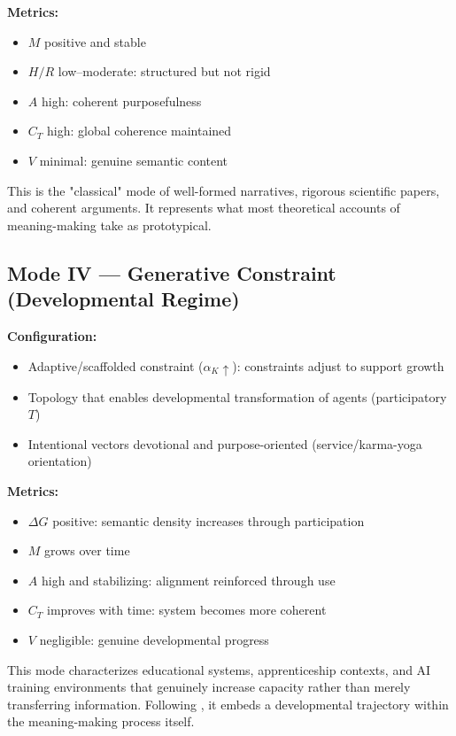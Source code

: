 \documentclass[12pt]{article}
\begin{document}
\textbf{Metrics:}
\begin{itemize}
\item $M$ positive and stable
\item $H/R$ low–moderate: structured but not rigid
\item $A$ high: coherent purposefulness
\item $C_T$ high: global coherence maintained
\item $V$ minimal: genuine semantic content
\end{itemize}

This is the "classical" mode of well-formed narratives, rigorous scientific papers, and coherent arguments. It represents what most theoretical accounts of meaning-making take as prototypical.

\subsection{Mode IV — Generative Constraint (Developmental Regime)}

\textbf{Configuration:}
\begin{itemize}
\item Adaptive/scaffolded constraint ($\alpha_K \uparrow$): constraints adjust to support growth
\item Topology that enables developmental transformation of agents (participatory $T$)
\item Intentional vectors devotional and purpose-oriented (service/karma-yoga orientation)
\end{itemize}

\textbf{Metrics:}
\begin{itemize}
\item $\Delta G$ positive: semantic density increases through participation
\item $M$ grows over time
\item $A$ high and stabilizing: alignment reinforced through use
\item $C_T$ improves with time: system becomes more coherent
\item $V$ negligible: genuine developmental progress
\end{itemize}

This mode characterizes educational systems, apprenticeship contexts, and AI training environments that genuinely increase capacity rather than merely transferring information. Following \citet{vygotsky1978mind}, it embeds a developmental trajectory within the meaning-making process itself.
\end{document}
